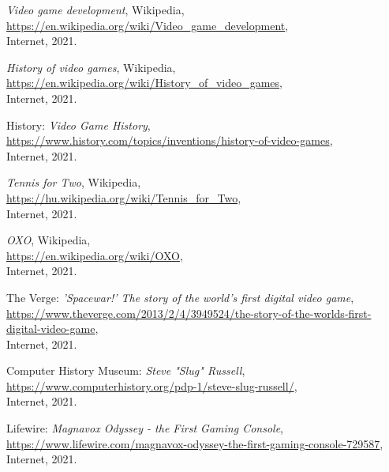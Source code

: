 
\begin{thebibliography}{x}

	\emph{Video game development}, Wikipedia, \\
	\url{https://en.wikipedia.org/wiki/Video_game_development}, \\
	Internet, 2021.
	
	\emph{History of video games}, Wikipedia, \\
	\url{https://en.wikipedia.org/wiki/History_of_video_games}, \\
	Internet, 2021.
	
	History: \emph{Video Game History}, \\
	\url{https://www.history.com/topics/inventions/history-of-video-games}, \\
	Internet, 2021.
	
	\emph{Tennis for Two}, Wikipedia, \\
	\url{https://hu.wikipedia.org/wiki/Tennis_for_Two}, \\
	Internet, 2021.
	
	\emph{OXO}, Wikipedia, \\
	\url{https://en.wikipedia.org/wiki/OXO}, \\
	Internet, 2021.
	
	The Verge: \emph{'Spacewar!' The story of the world's first digital video game}, \\
	\url{https://www.theverge.com/2013/2/4/3949524/the-story-of-the-worlds-first-digital-video-game}, \\
	Internet, 2021.
	
	Computer History Museum: \emph{Steve "Slug" Russell}, \\
	\url{https://www.computerhistory.org/pdp-1/steve-slug-russell/}, \\
	Internet, 2021.
	
	Lifewire: \emph{Magnavox Odyssey - the First Gaming Console}, \\
	\url{https://www.lifewire.com/magnavox-odyssey-the-first-gaming-console-729587}, \\
	Internet, 2021.
	

\end{thebibliography}
